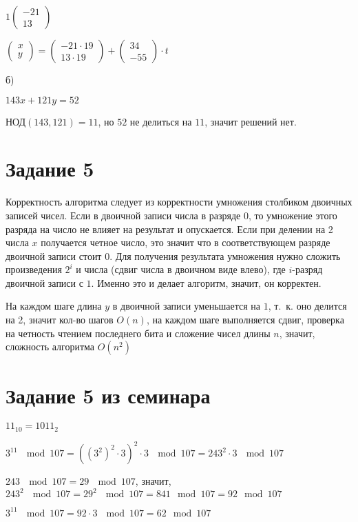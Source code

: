 \documentclass[a4paper,12pt]{article}
\begin{document}
$1\begin{pmatrix}
-21\\13
\end{pmatrix}$

$\begin{pmatrix}
x\\y
\end{pmatrix}=
\begin{pmatrix}
-21\cdot 19\\13\cdot 19
\end{pmatrix}+
\begin{pmatrix}
34\\-55
\end{pmatrix}\cdot t$

б)

$143x+121y=52$

НОД$(143,121)=11$, но $52$ не делиться на $11$, значит решений нет.

\section*{Задание 5}  
\hspace{0.5cm}
Корректность алгоритма следует из корректности умножения столбиком двоичных записей чисел. Если в двоичной записи числа в разряде $0$, то умножение этого разряда на число не влияет на результат и опускается. Если при делении на 2 числа $x$ получается четное число, это значит что в соответствующем разряде двоичной записи стоит $0$. Для получения результата умножения нужно сложить произведения $2^i$ и числа (сдвиг числа в двоичном виде влево), где $i$-разряд двоичной записи с $1$. Именно это и делает алгоритм, значит, он корректен.

На каждом шаге длина $y$ в двоичной записи уменьшается на $1$, т.~к. оно делится на 2, значит кол-во шагов $O(n)$, на каждом шаге выполняется сдвиг, проверка на четность чтением последнего бита и сложение чисел длины $n$, значит, сложность алгоритма $O(n^2)$

\section*{Задание 5 из семинара}  
\hspace{0.5cm}
$11_{10}=1011_{2}$

$3^{11}\ \mod 107=\left( \left(3^2\right) ^2\cdot 3\right) ^2\cdot 3\ \mod 107= 243^2\cdot 3\ \mod 107$

$243\ \mod 107 = 29\ \mod 107$, значит, $243^2\ \mod 107 = 29^2\ \mod 107= 841 \mod 107 = 92 \mod 107$

$3^{11}\ \mod 107=92\cdot 3\ \mod 107 = 62 \mod 107$ 
\end{document}
